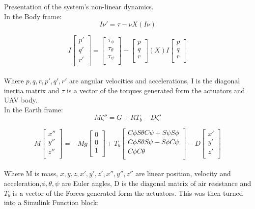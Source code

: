 \documentclass[12pt,a4paper,twoside]{report}
\begin{document}
				Presentation of the system's non-linear dynamics.
				\\
				In the Body frame:
				\[I\nu' = \tau - \nu X (I\nu)\]
				
				$$
				I
				\begin{bmatrix}
				p'\\
				q'\\
				r'\\
				\end{bmatrix}
				=
				\begin{bmatrix}
				\tau_\phi\\
				\tau_\theta\\
				\tau_\psi\\
				\end{bmatrix}
				-
				\begin{bmatrix}
				p\\
				q\\
				r\\
				\end{bmatrix}
				(X)
				I
				\begin{bmatrix}
				p\\
				q \\
				r\\
				\end{bmatrix}
				$$
				\\
				Where \(p, q, r, p', q', r'\) are angular velocities and accelerations, I is the diagonal inertia matrix and $\tau$ is a vector of the torques generated form the actuators and UAV body.
				\\
				In the Earth frame:
				\[M \zeta'' = G + RT_b - D\zeta' \]
				
				$$
				M
				\begin{bmatrix}
				 x''\\
				 y''\\
				 z''\\
				\end{bmatrix}
				=
				-Mg
				\begin{bmatrix}
				0\\
				0\\
				1\\
				\end{bmatrix}
				+
				T_b
				\begin{bmatrix}
				C\phi S\theta C\psi + S\psi S\phi \\
				C\phi S\theta S\psi - S\phi C\psi \\
				C\phi C\theta \\
				\end{bmatrix}
				-
				D
				\begin{bmatrix}
				x'\\
				y'\\
				z'\\
				\end{bmatrix}
				$$
				\\
				Where M is mass, \(x, y, z, x',y',z',x'', y'', z''\)  are linear position, velocity and acceleration,\(\phi,\theta, \psi\) are Euler angles, D is the diagonal matrix of air resistance and $T_b$ is a vector of the Forces generated form the actuators. This was then turned into a Simulink Function block:
				
\end{document}
